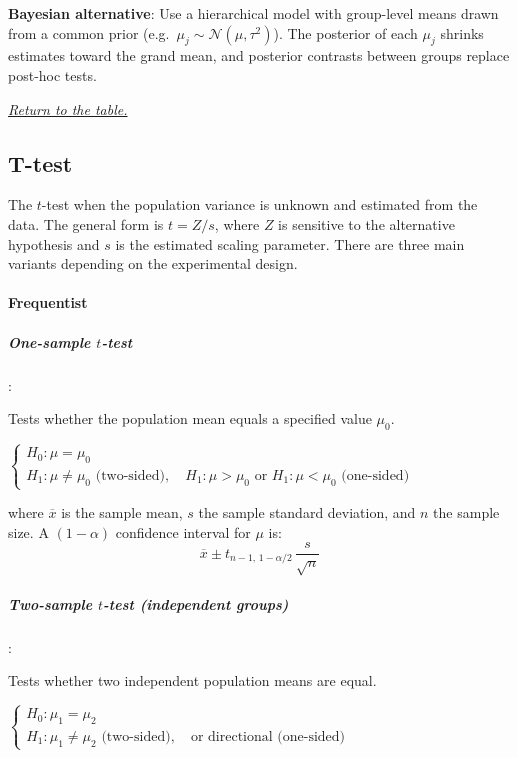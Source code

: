 \textbf{Bayesian alternative}: Use a hierarchical model with group-level means drawn from
a common prior (e.g.\ $\mu_j \sim \mathcal{N}(\mu, \tau^2)$). The posterior of each
$\mu_j$ shrinks estimates toward the grand mean, and posterior contrasts between groups
replace post-hoc tests.

\textit{\hyperref[statistical_method_table]{Return to the table.}}

\subsection{T-test}

The $t$-test  when the population variance is unknown and estimated from
the data. The general form is $t = Z/s$, where $Z$ is sensitive to the alternative
hypothesis and $s$ is the estimated scaling parameter. There are three main variants
depending on the experimental design.

\paragraph{Frequentist}

\subparagraph{One-sample $t$-test}:

Tests whether the population mean equals a specified value $\mu_0$.

$\begin{cases}
    H_0: \mu = \mu_0 \\
    H_1: \mu \neq \mu_0 \text{ (two-sided)}, \quad
    H_1: \mu > \mu_0 \text{ or } H_1: \mu < \mu_0 \text{ (one-sided)}
\end{cases}$

\begin{center}
\end{center}

where $\overline{x}$ is the sample mean, $s$ the sample standard deviation, and $n$ the
sample size. A $(1-\alpha)$ confidence interval for $\mu$ is:
$$\overline{x} \pm t_{n-1,\,1-\alpha/2}\,\dfrac{s}{\sqrt{n}}$$

\subparagraph{Two-sample $t$-test (independent groups)}:

Tests whether two independent population means are equal.

$\begin{cases}
    H_0: \mu_1 = \mu_2 \\
    H_1: \mu_1 \neq \mu_2 \text{ (two-sided)}, \quad \text{or directional (one-sided)}
\end{cases}$

